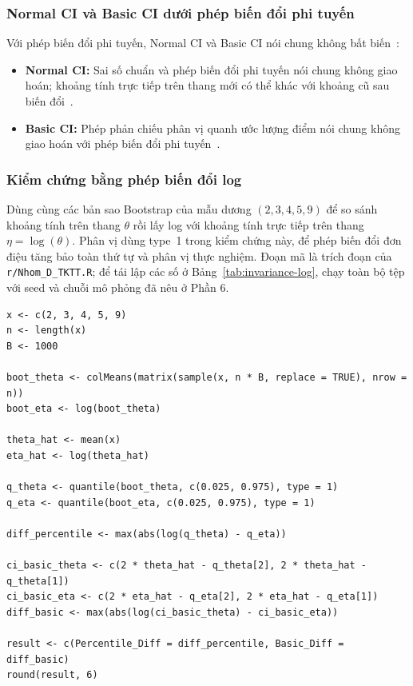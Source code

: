 \documentclass[12pt,a4paper]{article}
\theoremstyle{definition}
\numberwithin{equation}{section}
\begin{document}
		\subsubsection{Normal CI và Basic CI dưới phép biến đổi phi tuyến}
		Với phép biến đổi phi tuyến, Normal CI và Basic CI nói chung không bất biến~\cite{rizzo2019,efron1993,davison1997}:
		\begin{itemize}
			\item \textbf{Normal CI:} Sai số chuẩn và phép biến đổi phi tuyến nói chung không giao hoán; khoảng tính trực tiếp trên thang mới có thể khác với khoảng cũ sau biến đổi~\cite[tr. 163]{efron1993}.
			\item \textbf{Basic CI:} Phép phản chiếu phân vị quanh ước lượng điểm nói chung không giao hoán với phép biến đổi phi tuyến~\cite[tr. 203]{davison1997}.
		\end{itemize}

		\subsubsection{Kiểm chứng bằng phép biến đổi log}

Dùng cùng các bản sao Bootstrap của mẫu dương $(2,3,4,5,9)$ để so sánh
khoảng tính trên thang $\theta$ rồi lấy log với khoảng tính trực tiếp
trên thang $\eta=\log(\theta)$. Phân vị dùng type~1 trong kiểm chứng này,
để phép biến đổi đơn điệu tăng bảo toàn thứ tự và phân vị thực nghiệm. Đoạn mã là trích đoạn của \texttt{r/Nhom\_D\_TKTT.R}; để tái lập các số ở Bảng~\ref{tab:invariance-log}, chạy toàn bộ tệp với seed và chuỗi mô phỏng đã nêu ở Phần 6.

\begin{lstlisting}[style=Rstyle, caption={Bất biến dưới log}]
x <- c(2, 3, 4, 5, 9)
n <- length(x)
B <- 1000

boot_theta <- colMeans(matrix(sample(x, n * B, replace = TRUE), nrow = n))
boot_eta <- log(boot_theta)

theta_hat <- mean(x)
eta_hat <- log(theta_hat)

q_theta <- quantile(boot_theta, c(0.025, 0.975), type = 1)
q_eta <- quantile(boot_eta, c(0.025, 0.975), type = 1)

diff_percentile <- max(abs(log(q_theta) - q_eta))

ci_basic_theta <- c(2 * theta_hat - q_theta[2], 2 * theta_hat - q_theta[1])
ci_basic_eta <- c(2 * eta_hat - q_eta[2], 2 * eta_hat - q_eta[1])
diff_basic <- max(abs(log(ci_basic_theta) - ci_basic_eta))

result <- c(Percentile_Diff = diff_percentile, Basic_Diff = diff_basic)
round(result, 6)
\end{lstlisting}
\end{document}
